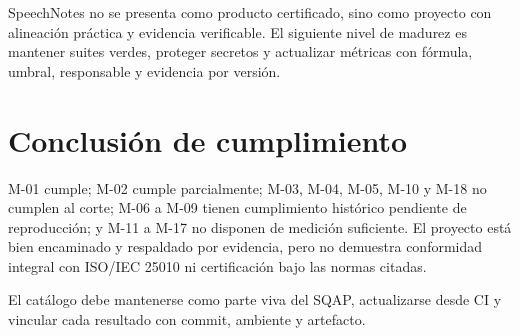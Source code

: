 SpeechNotes no se presenta como producto certificado, sino como proyecto con
alineación práctica y evidencia verificable. El siguiente nivel de madurez es
mantener suites verdes, proteger secretos y actualizar métricas con fórmula,
umbral, responsable y evidencia por versión.

\section{Conclusión de cumplimiento}

M-01 cumple; M-02 cumple parcialmente; M-03, M-04, M-05, M-10 y M-18 no cumplen
al corte; M-06 a M-09 tienen cumplimiento histórico pendiente de reproducción; y
M-11 a M-17 no disponen de medición suficiente. El proyecto está bien encaminado
y respaldado por evidencia, pero no demuestra conformidad integral con ISO/IEC
25010 ni certificación bajo las normas citadas.

El catálogo debe mantenerse como parte viva del SQAP, actualizarse desde CI y
vincular cada resultado con commit, ambiente y artefacto.
